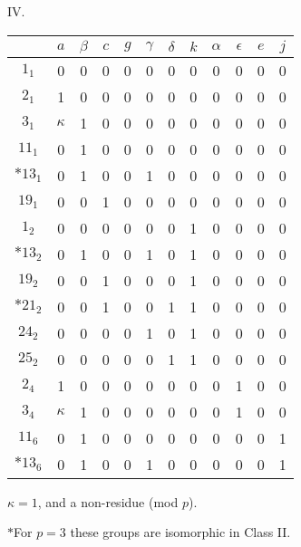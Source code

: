 \documentclass[oneside]{article}
\begin{document}
\begin{center}
\large IV. \normalsize

\begin{tabular}{|c|c|c|c|c|c|c|c|c|c|c|c|} \hline
       &  $a$   &$\beta$&$c$&$g$&$\gamma$&$\delta$&$k$&$\alpha$&$\epsilon$&$e$&$j$ \\ \hline
$1_1$  &    0   &    0  & 0 & 0 &    0   &    0   & 0 &    0   &     0    & 0 & 0  \\ \hline
$2_1$  &    1   &    0  & 0 & 0 &    0   &    0   & 0 &    0   &     0    & 0 & 0  \\ \hline
$3_1$  &$\kappa$&    1  & 0 & 0 &    0   &    0   & 0 &    0   &     0    & 0 & 0  \\ \hline
$11_1$ &    0   &    1  & 0 & 0 &    0   &    0   & 0 &    0   &     0    & 0 & 0  \\ \hline
$*13_1$&    0   &    1  & 0 & 0 &    1   &    0   & 0 &    0   &     0    & 0 & 0  \\ \hline
$19_1$ &    0   &    0  & 1 & 0 &    0   &    0   & 0 &    0   &     0    & 0 & 0  \\ \hline
$1_2$  &    0   &    0  & 0 & 0 &    0   &    0   & 1 &    0   &     0    & 0 & 0  \\ \hline
$*13_2$&    0   &    1  & 0 & 0 &    1   &    0   & 1 &    0   &     0    & 0 & 0  \\ \hline
$19_2$ &    0   &    0  & 1 & 0 &    0   &    0   & 1 &    0   &     0    & 0 & 0  \\ \hline
$*21_2$&    0   &    0  & 1 & 0 &    0   &    1   & 1 &    0   &     0    & 0 & 0  \\ \hline
$24_2$ &    0   &    0  & 0 & 0 &    1   &    0   & 1 &    0   &     0    & 0 & 0  \\ \hline
$25_2$ &    0   &    0  & 0 & 0 &    0   &    1   & 1 &    0   &     0    & 0 & 0  \\ \hline
$2_4$  &    1   &    0  & 0 & 0 &    0   &    0   & 0 &    0   &     1    & 0 & 0  \\ \hline
$3_4$  &$\kappa$&    1  & 0 & 0 &    0   &    0   & 0 &    0   &     1    & 0 & 0  \\ \hline
$11_6$ &    0   &    1  & 0 & 0 &    0   &    0   & 0 &    0   &     0    & 0 & 1  \\ \hline
$*13_6$&    0   &    1  & 0 & 0 &    1   &    0   & 0 &    0   &     0    & 0 & 1  \\ \hline
\end{tabular}

\footnotesize \noindent $\kappa = 1$, and a non-residue (mod $p$).

\noindent $*$For $p=3$ these groups are isomorphic in Class II.
\end{center}
\end{document}
